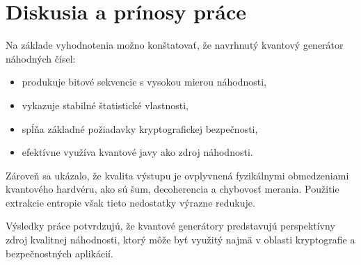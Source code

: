 \section{Diskusia a prínosy práce}


Na základe vyhodnotenia možno konštatovať, že navrhnutý kvantový generátor náhodných čísel:


\begin{itemize}

  \item produkuje bitové sekvencie s vysokou mierou náhodnosti,

  \item vykazuje stabilné štatistické vlastnosti,

  \item spĺňa základné požiadavky kryptografickej bezpečnosti,

  \item efektívne využíva kvantové javy ako zdroj náhodnosti.

\end{itemize}


Zároveň sa ukázalo, že kvalita výstupu je ovplyvnená fyzikálnymi obmedzeniami kvantového hardvéru, ako sú šum, decoherencia a chybovosť merania.
Použitie extrakcie entropie však tieto nedostatky výrazne redukuje.

Výsledky práce potvrdzujú, že kvantové generátory predstavujú perspektívny zdroj kvalitnej náhodnosti,
ktorý môže byť využitý najmä v oblasti kryptografie a bezpečnostných aplikácií.
